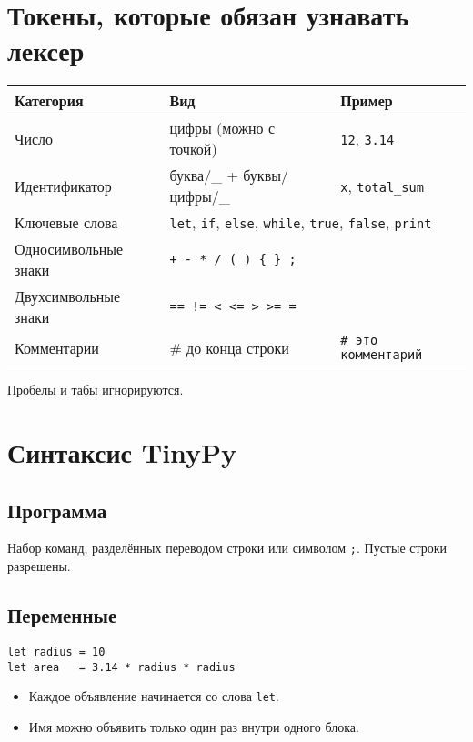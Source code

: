 \documentclass[12pt]{article}
\begin{document}
\section{Токены, которые обязан узнавать лексер}
\begin{longtable}{@{}llp{6cm}@{}}
	\toprule
	Категория            & Вид                                                                                                                         & Пример                          \\ \midrule
	\endhead
	Число                & цифры (можно с точкой)                                                                                                      & \texttt{12}, \texttt{3.14}      \\
	Идентификатор        & буква/\_ + буквы/цифры/\_                                                                                                   & \texttt{x}, \texttt{total\_sum} \\
	Ключевые слова       & \multicolumn{2}{l}{\texttt{let}, \texttt{if}, \texttt{else}, \texttt{while}, \texttt{true}, \texttt{false}, \texttt{print}}                                   \\
	Односимвольные знаки & \multicolumn{2}{l}{\texttt{+\; -\; *\; /\; (\; )\; \{\; \}\; ;}}                                                                                              \\
	Двухсимвольные знаки & \multicolumn{2}{l}{\texttt{==\; !=\; <\; <=\; >\; >=\; =}}                                                                                                    \\
	Комментарии          & \# до конца строки                                                                                                          & \texttt{\# это комментарий}     \\ \bottomrule
\end{longtable}
Пробелы и табы игнорируются.

\section{Синтаксис TinyPy}
\subsection{Программа}
Набор команд, разделённых переводом строки или символом \texttt{;}. Пустые строки разрешены.

\subsection{Переменные}
\begin{verbatim}
let radius = 10
let area   = 3.14 * radius * radius
\end{verbatim}
\begin{itemize}
	\item Каждое объявление начинается со слова \texttt{let}.
	\item Имя можно объявить только один раз внутри одного блока.
\end{itemize}
\end{document}
